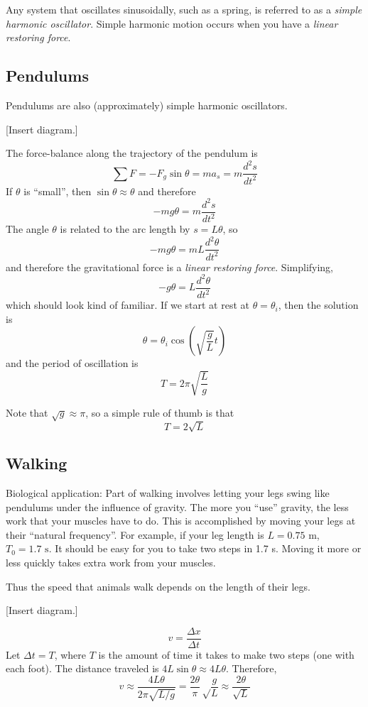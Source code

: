 Any system that oscillates sinusoidally, such as a spring, is referred to as a \textit{simple harmonic oscillator}. Simple harmonic motion occurs when you have a \textit{linear restoring force}.

\subsection{Pendulums}
Pendulums are also (approximately) simple harmonic oscillators.

[Insert diagram.]
\vspace{5cm}

The force-balance along the trajectory of the pendulum is
$$\sum F=-F_g\sin\theta=ma_s=m\frac{d^2s}{dt^2}$$
If $\theta$ is ``small'', then $\sin\theta\approx \theta$ and therefore
$$-mg\theta=m\frac{d^2s}{dt^2}$$
The angle $\theta$ is related to the arc length by $s=L\theta$, so
$$-mg\theta=mL\frac{d^2\theta}{dt^2}$$
and therefore the gravitational force is a \textit{linear restoring force}. Simplifying,
$$-g\theta=L\frac{d^2\theta}{dt^2}$$
which should look kind of familiar. If we start at rest at $\theta=\theta_i$, then the solution is
$$\theta=\theta_i\cos\left(\sqrt{\frac{g}{L}}t\right)$$
and the period of oscillation is
$$\boxed{T=2\pi\sqrt{\frac{L}{g}}}$$

Note that $\sqrt{g}\approx \pi$, so a simple rule of thumb is that
$$T=2\sqrt{L}$$

\subsection{Walking}
Biological application: Part of walking involves letting your legs swing like pendulums under the influence of gravity. The more you ``use'' gravity, the less work that your muscles have to do. This is accomplished by moving your legs at their ``natural frequency''. For example, if your leg length is $L=0.75\mbox{ m}$, $T_0=1.7\mbox{ s}$. It should be easy for you to take two steps in 1.7 s. Moving it more or less quickly takes extra work from your muscles. 

Thus the speed that animals walk depends on the length of their legs. 

[Insert diagram.]
\vspace{5cm}

$$v=\frac{\Delta{x}}{\Delta{t}}$$
Let $\Delta{t}=T$, where $T$ is the amount of time it takes to make two steps (one with each foot). The distance traveled is $4L\sin\theta\approx 4L\theta$. Therefore,
$$v\approx\frac{4L\theta}{2\pi\sqrt{L/g}}=\frac{2\theta}{\pi}\sqrt\frac{g}{L}\approx\frac{2\theta}{\sqrt{L}}$$

